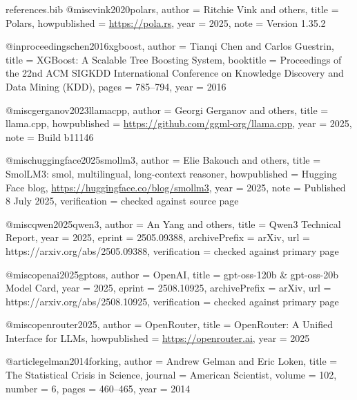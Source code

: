 \begin{filecontents*}[overwrite]{references.bib}
@misc{vink2020polars,
  author = {Ritchie Vink and others},
  title = {Polars},
  howpublished = {\url{https://pola.rs}},
  year = {2025},
  note = {Version 1.35.2}
}

@inproceedings{chen2016xgboost,
  author = {Tianqi Chen and Carlos Guestrin},
  title = {{XGBoost}: A Scalable Tree Boosting System},
  booktitle = {Proceedings of the 22nd ACM SIGKDD International Conference on Knowledge Discovery and Data Mining (KDD)},
  pages = {785--794},
  year = {2016}
}

@misc{gerganov2023llamacpp,
  author = {Georgi Gerganov and others},
  title = {llama.cpp},
  howpublished = {\url{https://github.com/ggml-org/llama.cpp}},
  year = {2025},
  note = {Build b11146}
}

@misc{huggingface2025smollm3,
  author = {Elie Bakouch and others},
  title = {{SmolLM3}: smol, multilingual, long-context reasoner},
  howpublished = {Hugging Face blog, \url{https://huggingface.co/blog/smollm3}},
  year = {2025},
  note = {Published 8 July 2025},
  verification = {checked against source page}
}

@misc{qwen2025qwen3,
  author = {An Yang and others},
  title = {{Qwen3} Technical Report},
  year = {2025},
  eprint = {2505.09388},
  archivePrefix = {arXiv},
  url = {https://arxiv.org/abs/2505.09388},
  verification = {checked against primary page}
}

@misc{openai2025gptoss,
  author = {{OpenAI}},
  title = {gpt-oss-120b \& gpt-oss-20b Model Card},
  year = {2025},
  eprint = {2508.10925},
  archivePrefix = {arXiv},
  url = {https://arxiv.org/abs/2508.10925},
  verification = {checked against primary page}
}

@misc{openrouter2025,
  author = {{OpenRouter}},
  title = {{OpenRouter}: A Unified Interface for {LLMs}},
  howpublished = {\url{https://openrouter.ai}},
  year = {2025}
}

@article{gelman2014forking,
  author = {Andrew Gelman and Eric Loken},
  title = {The Statistical Crisis in Science},
  journal = {American Scientist},
  volume = {102},
  number = {6},
  pages = {460--465},
  year = {2014}
}
\end{filecontents*}

\documentclass[11pt]{article}

\usepackage[utf8]{inputenc}
\usepackage[T1]{fontenc}
\usepackage{lmodern}
\usepackage[margin=1in]{geometry}
\usepackage{amsmath}
\usepackage{booktabs}
\usepackage{multirow}
\usepackage{array}
\usepackage{xcolor}
\usepackage[numbers,sort&compress]{natbib}
\usepackage[hidelinks]{hyperref}
\usepackage{microtype}

